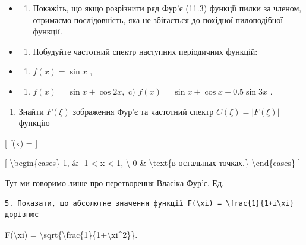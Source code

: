 \documentclass[
]{article}
\providecommand{\tightlist}{%
  \setlength{\itemsep}{0pt}\setlength{\parskip}{0pt}}
\begin{document}
\begin{itemize}
\tightlist
\item
  \begin{enumerate}
  \def\labelenumi{\arabic{enumi}.}
  \setcounter{enumi}{1}
  \tightlist
  \item
    Покажіть, що якщо розрізнити ряд Фур'є (11.3) функції пилки за
    членом, отримаємо послідовність, яка не збігається до похідної
    пилоподібної функції.
  \end{enumerate}
\item
  \begin{enumerate}
  \def\labelenumi{\arabic{enumi}.}
  \setcounter{enumi}{2}
  \tightlist
  \item
    Побудуйте частотний спектр наступних періодичних функцій:
  \end{enumerate}
\item
  \begin{enumerate}
  \def\labelenumi{\alph{enumi})}
  \tightlist
  \item
    \(f(x) = \sin x\) ,
  \end{enumerate}
\item
  \begin{enumerate}
  \def\labelenumi{\arabic{enumi})}
  \setcounter{enumi}{5}
  \tightlist
  \item
    \(f(x) = \sin x + \cos 2x,\) c)
    \(f(x) = \sin x + \cos x + 0.5 \sin 3x\) .
  \end{enumerate}
\end{itemize}

\begin{enumerate}
\def\labelenumi{\arabic{enumi}.}
\setcounter{enumi}{3}
\tightlist
\item
  Знайти \(F(\xi)\) зображення Фур'є та частотний спектр
  \(C(\xi) = |F(\xi)|\) функцію
\end{enumerate}

{[} f(x) = {]}

{[} \textbackslash begin\{cases\} 1, \& -1 \textless{} x \textless{} 1,
\textbackslash{} 0 \& \textbackslash text\{в остальных точках.\}
\textbackslash end\{cases\} {]}

Тут ми говоримо лише про перетворення Власіка-Фур'є. Ед.

\begin{verbatim}
5. Показати, що абсолютне значення функції F(\xi) = \frac{1}{1+i\xi} дорівнює
\end{verbatim}

\textbar F(\textbackslash xi)\textbar{} =
\textbackslash sqrt\{\textbackslash frac\{1\}\{1+\textbackslash xi\^{}2\}\}.
\end{document}
